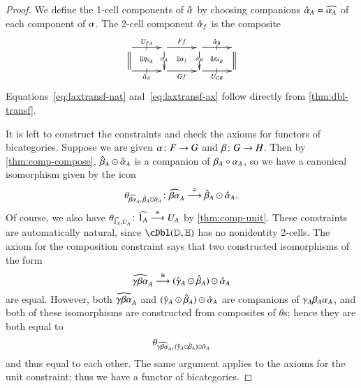 \begin{proof}
  We define the 1-cell components of $\alhat$ by choosing companions $\alhat_A = \widehat{\al_A}$ of each component of $\al$.
  The 2-cell component $\alhat_f$ is the composite
  \begin{equation}
    \vcenter{\xymatrix@R=1.5pc@C=2.5pc{
        \ar[r]|-@{|}^{U_{FA}}\ar@{=}[d] \ar@{}[dr]|{\Downarrow \eta_{\hat{\alpha}_A}} &
        \ar[r]^{Ff}\ar[d]|{\al_A} \ar@{}[dr]|{\Downarrow \al_f} &
        \ar[r]|-@{|}^{\alhat_B}\ar[d]|{\al_B} \ar@{}[dr]|{\Downarrow \epsilon_{\hat{\alpha}_B}} &
        \ar@{=}[d]\\
        \ar[r]|-@{|}_{\alhat_A} &
        \ar[r]_{Gf} &
        \ar[r]|-@{|}_{U_{GB}} & 
      }}\label{eq:oplax-2cell}
  \end{equation}
  Equations~\eqref{eq:laxtransf-nat} and~\eqref{eq:laxtransf-ax}
  follow directly from \autoref{thm:dbl-transf}.

  It is left to construct the constraints and check the axioms for functors of bicategories. Suppose we are given $\al\maps F\to G$ and $\be\maps G\to H$.  Then by
  \autoref{thm:comp-compose}, $\behat_A\odot\alhat_A$ is a companion
  of $\be_A\circ \al_A$, so we have a canonical isomorphism given by the icon
  \[\theta_{\widehat{\be\al}_A, \,\behat_A\odot\alhat_A}\maps
  \widehat{\be\al}_A \too[\iso] \behat_A\odot\alhat_A.
  \]
  Of course, we also have $\theta_{\widehat{1_A},U_A}\maps
  \widehat{1_A} \too[\iso] U_A$ by \autoref{thm:comp-unit}.  These
  constraints are automatically natural, since $\cDbl(\lD,\lE)$ has no
  nonidentity 2-cells.  The axiom for the composition constraint says
  that two constructed isomorphisms of the form
  \[\widehat{\gm\be\al}_A \too[\iso] (\gmhat_A \odot \behat_A)\odot \alhat_A\]
  are equal.  However, both $\widehat{\gm\be\al}_A$ and $(\gmhat_A
  \odot \behat_A)\odot \alhat_A$ are companions of $\gm_A\be_A\al_A$,
  and both of these isomorphisms are constructed from composites of $\theta$s;
  hence they are both equal to
  \[\theta_{\widehat{\gm\be\al}_A,\, (\gmhat_A \odot \behat_A)\odot
    \alhat_A}\] and thus equal to each other.  The same argument
  applies to the axioms for the unit constraint; thus we have a functor of bicategories.
\end{proof}

